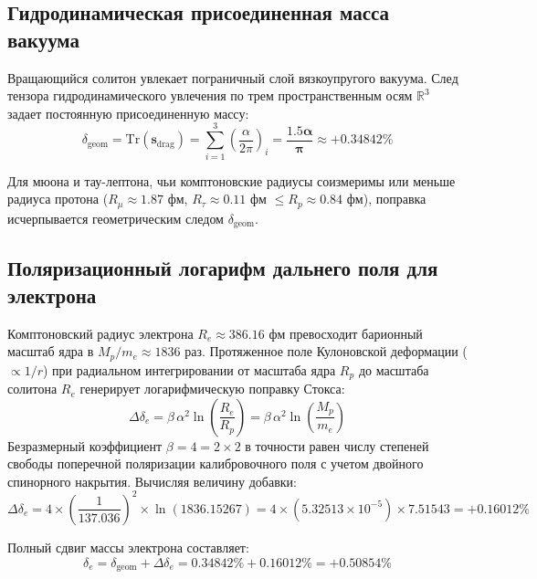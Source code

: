 \documentclass[12pt,a4paper]{article}
\begin{document}
	\subsection{Гидродинамическая присоединенная масса вакуума}
	Вращающийся солитон увлекает пограничный слой вязкоупругого вакуума. След тензора гидродинамического увлечения по трем пространственным осям $\mathbb{R}^3$ задает постоянную присоединенную массу:
	\begin{equation}
		\delta_{\text{geom}} = \mathrm{Tr}(\mathbf{s}_{\text{drag}}) = \sum_{i=1}^3 \left(\frac{\alpha}{2\pi}\right)_i = \mathbf{\frac{1.5 \alpha}{\pi}} \approx \mathbf{+0.34842\%}
	\end{equation}
	
	Для мюона и тау-лептона, чьи комптоновские радиусы соизмеримы или меньше радиуса протона ($R_\mu \approx 1.87$ фм, $R_\tau \approx 0.11$ фм $\le R_p \approx 0.84$ фм), поправка исчерпывается геометрическим следом $\delta_{\text{geom}}$.
	
	\subsection{Поляризационный логарифм дальнего поля для электрона}
	Комптоновский радиус электрона $R_e \approx 386.16$ фм превосходит барионный масштаб ядра в $M_p/m_e \approx 1836$ раз. Протяженное поле Кулоновской деформации ($\propto 1/r$) при радиальном интегрировании от масштаба ядра $R_p$ до масштаба солитона $R_e$ генерирует логарифмическую поправку Стокса:
	\begin{equation}
		\Delta \delta_e = \beta \, \alpha^2 \ln\left( \frac{R_e}{R_p} \right) = \beta \, \alpha^2 \ln\left( \frac{M_p}{m_e} \right)
	\end{equation}
	Безразмерный коэффициент $\beta = 4 = 2 \times 2$ в точности равен числу степеней свободы поперечной поляризации калибровочного поля с учетом двойного спинорного накрытия. Вычисляя величину добавки:
	\begin{equation}
		\Delta \delta_e = 4 \times \left(\frac{1}{137.036}\right)^2 \times \ln(1836.15267) = 4 \times (5.32513 \times 10^{-5}) \times 7.51543 = \mathbf{+0.16012\%}
	\end{equation}
	
	Полный сдвиг массы электрона составляет:
	\begin{equation}
		\delta_e = \delta_{\text{geom}} + \Delta \delta_e = 0.34842\% + 0.16012\% = \mathbf{+0.50854\%}
	\end{equation}
	
\end{document}
